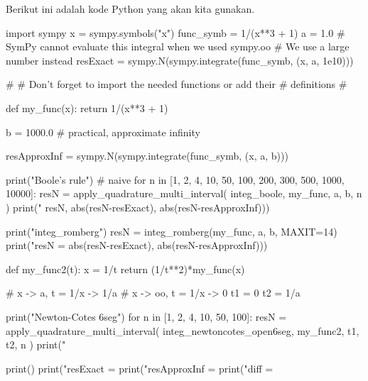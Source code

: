 \documentclass[a4paper,11pt,bahasa]{article} %
\begin{document}
Berikut ini adalah kode Python yang akan kita gunakan.
\begin{pythoncode}
import sympy
x = sympy.symbols("x")
func_symb = 1/(x**3 + 1)
a = 1.0
# SymPy cannot evaluate this integral when we used sympy.oo
# We use a large number instead
resExact = sympy.N(sympy.integrate(func_symb, (x, a, 1e10)))

#
# Don't forget to import the needed functions or add their
# definitions
#

def my_func(x):
    return 1/(x**3 + 1)

b = 1000.0 # practical, approximate infinity

resApproxInf = sympy.N(sympy.integrate(func_symb, (x, a, b)))

print("\nUsing Boole's rule") # naive
for n in [1, 2, 4, 10, 50, 100, 200, 300, 500, 1000, 10000]:
    resN = apply_quadrature_multi_interval(
        integ_boole, my_func, a, b, n
    )    
    print("%
        resN, abs(resN-resExact), abs(resN-resApproxInf)))

print("\nUsing integ_romberg")
resN = integ_romberg(my_func, a, b, MAXIT=14)
print("resN = %
    abs(resN-resExact), abs(resN-resApproxInf)))

def my_func2(t):
    x = 1/t
    return (1/t**2)*my_func(x)

# x -> a, t = 1/x -> 1/a
# x -> oo, t = 1/x -> 0
t1 = 0
t2 = 1/a

print("\nUsing Newton-Cotes 6seg")
for n in [1, 2, 4, 10, 50, 100]:
    resN = apply_quadrature_multi_interval(
        integ_newtoncotes_open6seg, my_func2, t1, t2, n
    )
    print("%

print()
print("resExact     = %
print("resApproxInf = %
print("diff         = %
\end{pythoncode}
\end{document}
